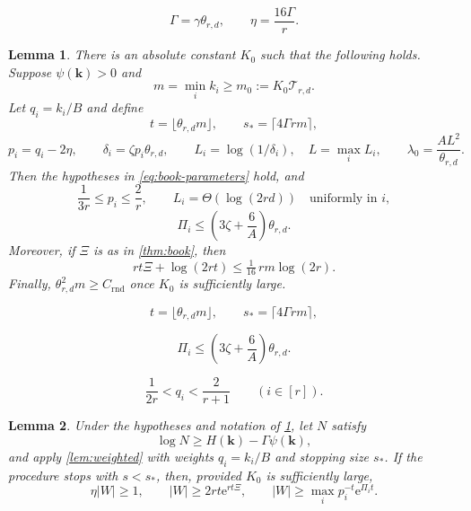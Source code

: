 \documentclass[10pt,a4paper]{amsart}
\newtheorem{lemma}{Lemma}
\newcommand{\Ent}{H}
\newcommand{\e}{\mathrm e}
\newcommand{\kk}{\mathbf k}
\newcommand{\pot}{\psi}
\begin{document}
\begin{equation}\label{eq:Gamma-eta}
 \Gamma=\gamma\theta_{r,d},
 \qquad
 \eta=\frac{16\Gamma}{r}.
\end{equation}

\begin{lemma}\label{lem:parameters}
There is an absolute constant $K_0$ such that the following holds.  Suppose
$\pot(\kk)>0$ and
\[
 m=\min_i k_i\ge m_0:=K_0\mathcal T_{r,d}.
\]
Let $q_i=k_i/B$ and define
\begin{equation}\label{eq:t-sstar}
 t=\lfloor\theta_{r,d}m\rfloor,
 \qquad
 s_\ast=\lceil4\Gamma rm\rceil,
\end{equation}
\[
 p_i=q_i-2\eta,
 \qquad
 \delta_i=\zeta p_i\theta_{r,d},
 \qquad
 L_i=\log(1/\delta_i),\quad L=\max_iL_i,
 \qquad
 \lambda_0=\frac{AL^2}{\theta_{r,d}}.
\]
Then the hypotheses in \eqref{eq:book-parameters} hold, and
\begin{equation}\label{eq:p-window}
 \frac1{3r}\le p_i\le\frac2r,
 \qquad
 L_i=\Theta(\log(2rd))\quad\text{uniformly in $i$},
\end{equation}
\begin{equation}\label{eq:Pi-bound}
 \Pi_i\le\left(3\zeta+\frac6A\right)\theta_{r,d}.
\end{equation}
Moreover, if $\Xi$ is as in \cref{thm:book}, then
\begin{equation}\label{eq:Xi-bound}
 rt\Xi+\log(2rt)\le\tfrac1{16}\,rm\log(2r).
\end{equation}
Finally, $\theta_{r,d}^2m\ge C_{\mathrm{rnd}}$ once $K_0$ is sufficiently
large.
\end{lemma}

\begin{equation}
 t=\lfloor\theta_{r,d}m\rfloor,
 \qquad
 s_\ast=\lceil4\Gamma rm\rceil,
\end{equation}

\begin{equation}
 \Pi_i\le\left(3\zeta+\frac6A\right)\theta_{r,d}.
\end{equation}

\begin{equation}\label{eq:q-window}
 \frac1{2r}<q_i<\frac2{r+1}
 \qquad(i\in[r]).
\end{equation}

\begin{lemma}\label{lem:reservoir}
Under the hypotheses and notation of \cref{lem:parameters}, let $N$ satisfy
\[
 \log N\ge \Ent(\kk)-\Gamma\pot(\kk),
\]
and apply \cref{lem:weighted} with weights $q_i=k_i/B$ and stopping size
$s_\ast$.  If the procedure stops with $s<s_\ast$, then, provided $K_0$ is
sufficiently large,
\begin{equation}\label{eq:reservoir-conclusion}
 \eta|W|\ge1,
 \qquad
 |W|\ge2rt\e^{rt\Xi},
 \qquad
 |W|\ge\max_i p_i^{-t}\e^{\Pi_it}.
\end{equation}
\end{lemma}
\end{document}
